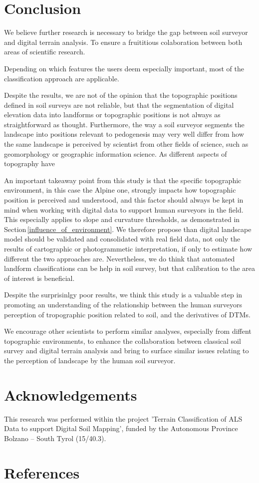 \documentclass[preprint,12pt,authoryear]{elsarticle}
\begin{document}
\section{Conclusion}
We believe further research is necessary to bridge the gap between soil surveyor and digital terrain analysis. To ensure a fruititious colaboration between both areas of scientific research.

Depending on which features the users deem especially important, most of the classification approach are applicable.

Despite the results, we are not of the opinion that the topographic positions defined in  soil surveys are not reliable, but that the segmentation of digital elevation data into landforms or topographic positions is not always as straightforward as thought. Furthermore, the way a soil surveyor segments the landscape into positions relevant to pedogenesis may very well differ from how the same landscape is perceived by scientist from other fields of science, such as geomorphology or geographic information science. As different aspects of topography have  

An important takeaway point from this study is that the specific topographic environment, in this case the Alpine one, strongly impacts how topographic position is perceived and understood, and this factor should always be kept in mind when working with digital data to support human surveyors in the field. This especially applies to slope and curvature thresholds, as demonstrated in Section\,\ref{influence_of_environment}. We therefore propose than digital landscape model should be validated and consolidated with real field data, not only the results of cartographic or photogrammetic interpretation, if only to estimate how different the two approaches are. 
Nevertheless, we do think that automated landform classifications can be help in soil survey, but that calibration to the area of interest is beneficial.

Despite the surprisinlgy poor results, we think this study is a valuable step in promoting an understanding of the relationship between the human surveyors perception of tropographic position related to soil, and the derivatives of DTMs. 

We encourage other scientists to perform similar analyses, especially from diffent topographic environments, to enhance the collaboration between classical soil survey and digital terrain analysis and bring to surface similar issues relating to the perception of landscape by the human soil surveyor.
\section*{Acknowledgements} This research was performed within the project 'Terrain Classification of ALS Data to support Digital Soil Mapping', funded by the Autonomous Province Bolzano -- South Tyrol (15/40.3).
\section*{References}

\end{document}
